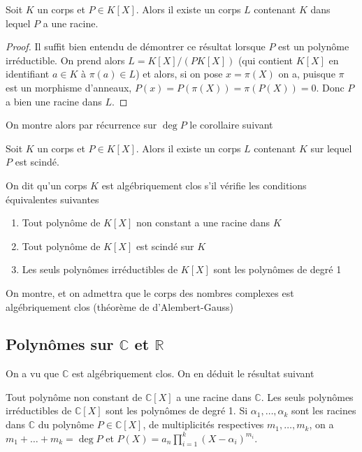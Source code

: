 \begin{thm}
Soit $K$ un corps et $P \in K[X]$. Alors il existe un corps $L$ contenant $K$ dans lequel $P$ a une racine.
\end{thm}

\begin{proof}
Il suffit bien entendu de démontrer ce résultat lorsque $P$ est un polynôme irréductible. On prend alors $L = K[X]/(PK[X])$ (qui contient $K[X]$ en identifiant $a \in K$ à $\pi(a) \in L$) et alors, si on pose $x = \pi(X)$ on a, puisque $\pi$ est un morphisme d'anneaux, $P(x) = P(\pi(X)) = \pi(P(X)) = 0$. Donc $P$ a bien une racine dans $L$.
\end{proof}

On montre alors par récurrence sur $\deg P$ le corollaire suivant

\begin{thm}
Soit $K$ un corps et $P \in K[X]$. Alors il existe un corps $L$ contenant $K$ sur lequel $P$ est scindé.
\end{thm}

\begin{de}
On dit qu'un corps $K$ est algébriquement clos s'il vérifie les conditions équivalentes suivantes 
\begin{enumerate}
\item Tout polynôme de $K[X]$ non constant a une racine dans $K$ 
\item Tout polynôme de $K[X]$ est scindé sur $K$ 
\item Les seuls polynômes irréductibles de $K[X]$ sont les polynômes de degré 1
\end{enumerate}
\end{de}

\begin{thm}
On montre, et on admettra que le corps des nombres complexes est algébriquement clos (théorème de d'Alembert-Gauss)
\end{thm}

\subsection{Polynômes sur $\mathbb{C}$ et $\mathbb{R}$}

On a vu que $\mathbb{C}$ est algébriquement clos. On en déduit le résultat suivant

\begin{thm}
Tout polynôme non constant de $\mathbb{C}[X]$ a une racine dans $\mathbb{C}$. Les seuls polynômes irréductibles de $\mathbb{C}[X]$ sont les polynômes de degré 1. Si $\alpha_1,\ldots,\alpha_k$ sont les racines dans $\mathbb{C}$ du polynôme $P \in \mathbb{C}[X]$, de multiplicités respectives $m_1,\ldots,m_k$, on a $m_1 + \ldots + m_k = \deg P$ et $P(X) = a_n \prod_{i=1}^k (X - \alpha_i)^{m_i}$.
\end{thm}

